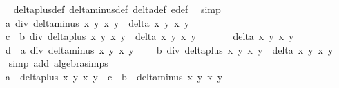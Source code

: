\begin{isabellebody}
\ \ \ \ \isamarkupfalse%
\ delta{\isacharunderscore}plus{\isacharunderscore}def\ delta{\isacharunderscore}minus{\isacharunderscore}def\ delta{\isacharunderscore}def\ e{\isacharunderscore}def\ \isamarkupfalse%
\ simp\isanewline
\ \ \isamarkupfalse%
\ \isamarkupfalse%
\ {\isachardoublequoteopen}{\isachardot}{\isachardot}{\isachardot}\ {\isacharequal}\ \isanewline
\ \ \ \ {\isacharparenleft}{\isacharparenleft}a\ div\ delta{\isacharunderscore}minus\ x{}\ y{}\ x{}\ y{}{\isacharparenright}\ {\isacharasterisk}\ {\isacharparenleft}delta\ x{}\ y{}\ x{}\ y{}{\isacharparenright}\ {\isacharplus}\isanewline
\ \ \ \ c\ {\isacharasterisk}\ {\isacharparenleft}b\ div\ delta{\isacharunderscore}plus\ x{}\ y{}\ x{}\ y{}{\isacharparenright}\ {\isacharasterisk}\ {\isacharparenleft}delta\ x{}\ y{}\ x{}\ y{}{\isacharparenright}\ {\isacharminus}\isanewline
\ \ \ \ {}\ {\isacharasterisk}\ {\isacharparenleft}delta\ x{}\ y{}\ x{}\ y{}{\isacharparenright}\ {\isacharminus}\isanewline
\ \ \ \ d\ {\isacharasterisk}\ {\isacharparenleft}a\ div\ delta{\isacharunderscore}minus\ x{}\ y{}\ x{}\ y{}{\isacharparenright}\ {\isacharasterisk}\isanewline
\ \ \ {\isacharparenleft}b\ div\ delta{\isacharunderscore}plus\ x{}\ y{}\ x{}\ y{}{\isacharparenright}\ {\isacharasterisk}\ {\isacharparenleft}delta\ x{}\ y{}\ x{}\ y{}{\isacharparenright}\isanewline
\ \ \ \ \isamarkupfalse%
{\isacharparenleft}simp\ add{\isacharcolon}\ algebra{\isacharunderscore}simps{\isacharparenright}\isanewline
\ \ \isamarkupfalse%
\ \isamarkupfalse%
\ {\isachardoublequoteopen}{\isachardot}{\isachardot}{\isachardot}\ {\isacharequal}\ \isanewline
\ \ \ \ {\isacharparenleft}{\isacharparenleft}a\ {\isacharasterisk}\ delta{\isacharunderscore}plus\ x{}\ y{}\ x{}\ y{}{\isacharparenright}\ {\isacharplus}\ c\ {\isacharasterisk}\ {\isacharparenleft}b\ {\isacharasterisk}\ delta{\isacharunderscore}minus\ x{}\ y{}\ x{}\ y{}{\isacharparenright}\ {\isacharminus}\isanewline

\end{isabellebody}
